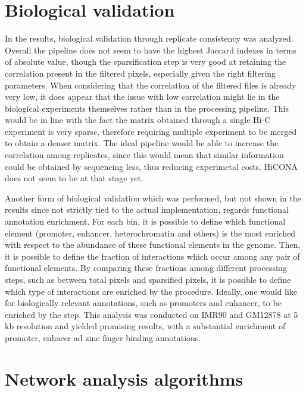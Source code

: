 \section{Biological validation}

In the results, biological validation through replicate consistency was analyzed. Overall the pipeline does not seem to have the highest Jaccard indexes in terms of absolute value, though the sparsification step is very good at retaining the correlation present in the filtered pixels, especially given the right filtering parameters. When considering that the correlation of the filtered files is already very low, it does appear that the issue with low correlation might lie in the biological experiments themselves rather than in the processing pipeline. This would be in line with the fact the matrix obtained through a single Hi-C experiment is very sparse, therefore requiring multiple experiment to be merged to obtain a denser matrix. The ideal pipeline would be able to increase the correlation among replicates, since this would mean that similar information could be obtained by sequencing less, thus reducing experimetal costs. HiCONA does not seem to be at that stage yet.

Another form of biological validation which was performed, but not shown in the results since not strictly tied to the actual implementation, regards functional annotation enrichment. For each bin, it is possible to define which functional element (promoter, enhancer, heterochromatin and others) is the most enriched with respect to the abundance of these functional elements in the genome. Then, it is possible to define the fraction of interactions which occur among any pair of functional elements. By comparing these fractions among different processing steps, such as between total pixels and sparsified pixels, it is possible to define which type of interactions are enriched by the procedure. Ideally, one would like for biologically relevant annotations, such as promoters and enhancer, to be enriched by the step. This analysis was conducted on IMR90 and GM12878 at 5 kb resolution and yielded promising results, with a substantial enrichment of promoter, enhacer ad zinc finger binding annotations. 


\section{Network analysis algorithms}

